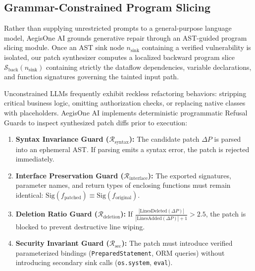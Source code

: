 \documentclass[journal,twoside]{IEEEtran}
\begin{document}
\subsection{Grammar-Constrained Program Slicing}
Rather than supplying unrestricted prompts to a general-purpose language model, AegisOne AI grounds generative repair through an AST-guided program slicing module. Once an AST sink node $n_{\text{sink}}$ containing a verified vulnerability is isolated, our patch synthesizer computes a localized backward program slice $\mathcal{S}_{\text{back}}(n_{\text{sink}})$ containing strictly the dataflow dependencies, variable declarations, and function signatures governing the tainted input path.

Unconstrained LLMs frequently exhibit reckless refactoring behaviors: stripping critical business logic, omitting authorization checks, or replacing native classes with placeholders. AegisOne AI implements deterministic programmatic Refusal Guards to inspect synthesized patch diffs prior to execution:
\begin{enumerate}
    \item \textbf{Syntax Invariance Guard ($\mathcal{R}_{\text{syntax}}$):} The candidate patch $\Delta P$ is parsed into an ephemeral AST. If parsing emits a syntax error, the patch is rejected immediately.
    \item \textbf{Interface Preservation Guard ($\mathcal{R}_{\text{interface}}$):} The exported signatures, parameter names, and return types of enclosing functions must remain identical: $\text{Sig}(f_{\text{patched}}) \equiv \text{Sig}(f_{\text{original}})$.
    \item \textbf{Deletion Ratio Guard ($\mathcal{R}_{\text{deletion}}$):} If $\frac{|\text{LinesDeleted}(\Delta P)|}{|\text{LinesAdded}(\Delta P)| + 1} > 2.5$, the patch is blocked to prevent destructive line wiping.
    \item \textbf{Security Invariant Guard ($\mathcal{R}_{\text{sec}}$):} The patch must introduce verified parameterized bindings (\texttt{PreparedStatement}, ORM queries) without introducing secondary sink calls (\texttt{os.system}, \texttt{eval}).
\end{enumerate}
\end{document}
